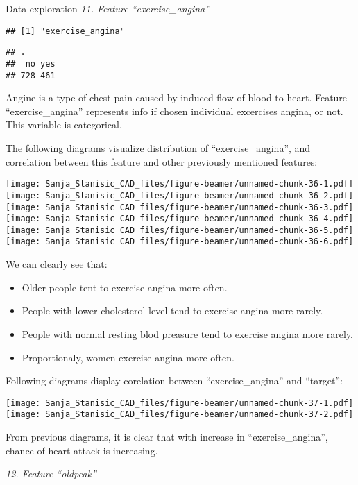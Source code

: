 \documentclass[
  ignorenonframetext,
]{beamer}
\begin{document}
\begin{frame}[fragile]{Data exploration}
\emph{11. Feature ``exercise\_angina''}

\begin{verbatim}
## [1] "exercise_angina"
\end{verbatim}

\begin{verbatim}
## .
##  no yes 
## 728 461
\end{verbatim}

Angine is a type of chest pain caused by induced flow of blood to heart.
Feature ``exercise\_angina'' represents info if chosen individual
excercises angina, or not. This variable is categorical.

The following diagrams visualize distribution of ``exercise\_angina'',
and correlation between this feature and other previously mentioned
features:

\texttt{[image: Sanja\_Stanisic\_CAD\_files/figure-beamer/unnamed-chunk-36-1.pdf]}
\texttt{[image: Sanja\_Stanisic\_CAD\_files/figure-beamer/unnamed-chunk-36-2.pdf]}
\texttt{[image: Sanja\_Stanisic\_CAD\_files/figure-beamer/unnamed-chunk-36-3.pdf]}
\texttt{[image: Sanja\_Stanisic\_CAD\_files/figure-beamer/unnamed-chunk-36-4.pdf]}
\texttt{[image: Sanja\_Stanisic\_CAD\_files/figure-beamer/unnamed-chunk-36-5.pdf]}
\texttt{[image: Sanja\_Stanisic\_CAD\_files/figure-beamer/unnamed-chunk-36-6.pdf]}

We can clearly see that:

\begin{itemize}
\item
  Older people tent to exercise angina more often.
\item
  People with lower cholesterol level tend to exercise angina more
  rarely.
\item
  People with normal resting blod preasure tend to exercise angina more
  rarely.
\item
  Proportionaly, women exercise angina more often.
\end{itemize}

Following diagrams display corelation between ``exercise\_angina'' and
``target'':

\texttt{[image: Sanja\_Stanisic\_CAD\_files/figure-beamer/unnamed-chunk-37-1.pdf]}
\texttt{[image: Sanja\_Stanisic\_CAD\_files/figure-beamer/unnamed-chunk-37-2.pdf]}

From previous diagrams, it is clear that with increase in
``exercise\_angina'', chance of heart attack is increasing.

\emph{12. Feature ``oldpeak''}


\end{frame}
\end{document}
